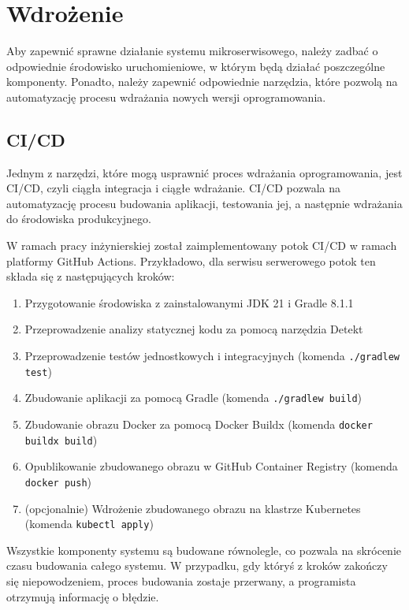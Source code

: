 \clearpage %

\section{Wdrożenie}

Aby zapewnić sprawne działanie systemu mikroserwisowego, należy zadbać o odpowiednie środowisko uruchomieniowe, w którym będą działać poszczególne komponenty. Ponadto, należy zapewnić odpowiednie narzędzia, które pozwolą na automatyzację procesu wdrażania nowych wersji oprogramowania.

\subsection{CI/CD}

Jednym z narzędzi, które mogą usprawnić proces wdrażania oprogramowania, jest CI/CD, czyli ciągła integracja i ciągłe wdrażanie. CI/CD pozwala na automatyzację procesu budowania aplikacji, testowania jej, a następnie wdrażania do środowiska produkcyjnego.

W ramach pracy inżynierskiej został zaimplementowany potok CI/CD w ramach platformy GitHub Actions. Przykładowo, dla serwisu serwerowego potok ten składa się z następujących kroków:

\begin{enumerate}
    \item Przygotowanie środowiska z zainstalowanymi JDK 21 i Gradle \cite{gradle} 8.1.1
    \item Przeprowadzenie analizy statycznej kodu za pomocą narzędzia Detekt \cite{detekt}
    \item Przeprowadzenie testów jednostkowych i integracyjnych (komenda \texttt{./gradlew test})
    \item Zbudowanie aplikacji za pomocą Gradle (komenda \texttt{./gradlew build})
    \item Zbudowanie obrazu Docker za pomocą Docker Buildx (komenda \texttt{docker buildx build})
    \item Opublikowanie zbudowanego obrazu w GitHub Container Registry \cite{ghcr} (komenda \texttt{docker push})
    \item (opcjonalnie) Wdrożenie zbudowanego obrazu na klastrze Kubernetes (komenda \texttt{kubectl apply})
\end{enumerate}

Wszystkie komponenty systemu są budowane równolegle, co pozwala na skrócenie czasu budowania całego systemu. W przypadku, gdy któryś z kroków zakończy się niepowodzeniem, proces budowania zostaje przerwany, a programista otrzymują informację o błędzie.

